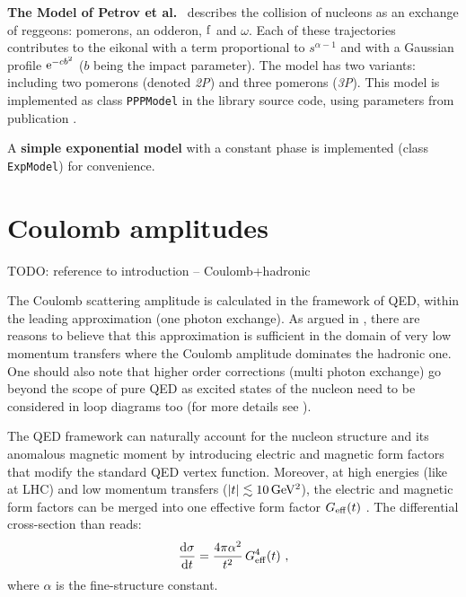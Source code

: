 \documentclass[preprint,12pt]{elsarticle}
\def\class#1{{\tt #1}}
\def\e{{\rm e}}
\def\d{{\rm d}}
\def\un#1{{\,\rm #1}}
\begin{document}
{\bf The Model of Petrov et al.}~\cite{petrov02} describes the collision of nucleons as an exchange of reggeons: pomerons, an odderon, $\rm f$ and $\omega$. Each of these trajectories contributes to the eikonal with a term proportional to $s^{\alpha - 1}$ and with a Gaussian profile $\e^{-c b^2}$ ($b$ being the impact parameter). The model has two variants: including two pomerons (denoted {\em 2P}\/) and three pomerons ({\em 3P}\/). This model is implemented as class \class{PPPModel} in the library source code, using parameters from publication \cite{petrov02}.


A {\bf simple exponential model} with a constant phase is implemented (class \class{ExpModel}) for convenience.




\section{Coulomb amplitudes}\label{s:coul mod}

TODO: reference to introduction -- Coulomb+hadronic

The Coulomb scattering amplitude is calculated in the framework of QED, within the leading approximation (one photon exchange). As argued in \cite[section 1.3.6]{jan_thesis}, there are reasons to believe that this approximation is sufficient in the domain of very low momentum transfers where the Coulomb amplitude dominates the hadronic one. One should also note that higher order corrections (multi photon exchange) go beyond the scope of pure QED as excited states of the nucleon need to be considered in loop diagrams too (for more details see \cite{arrington07,puckett10}).

The QED framework can naturally account for the nucleon structure and its anomalous magnetic moment by introducing electric and magnetic form factors that modify the standard QED vertex function. Moreover, at high energies (like at LHC) and low momentum transfers ($|t| \lesssim 10\un{GeV^2}$), the electric and magnetic form factors can be merged into one effective form factor $G_{\rm eff}(t)$ \cite[equation (31)]{block06}. The differential cross-section than reads:
\begin{equation}
{\d\sigma\over\d t} = {4\pi \alpha^2\over t^2}\, G_{\rm eff}^4(t)\ ,
\end{equation}
where $\alpha$ is the fine-structure constant.
\end{document}
